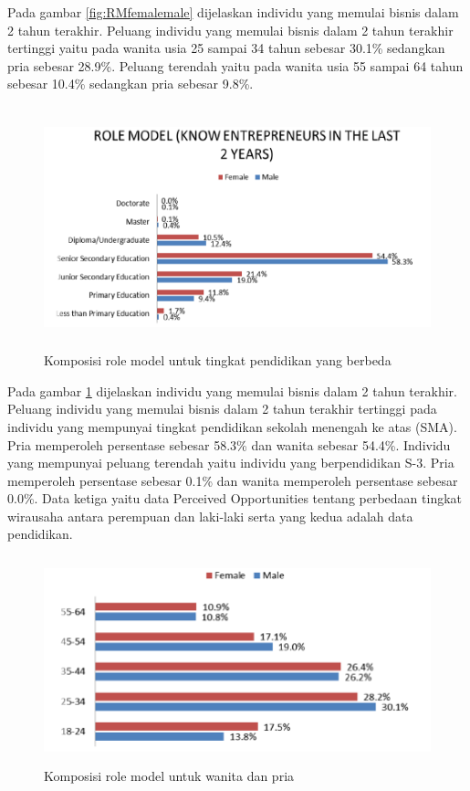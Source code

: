 Pada gambar \ref{fig:RMfemalemale} dijelaskan individu yang memulai bisnis dalam 2 tahun terakhir. Peluang individu yang memulai bisnis dalam 2 tahun terakhir tertinggi yaitu pada wanita usia 25 sampai 34 tahun sebesar 30.1\% sedangkan pria sebesar 28.9\%. Peluang terendah yaitu pada wanita usia 55 sampai 64 tahun sebesar 10.4\% sedangkan pria sebesar 9.8\%.


\begin{figure} [H]
	\centering  
	\includegraphics[width=13cm, height=7cm]{RMpendidikan} 
	\caption[Komposisi role model untuk tingkat pendidikan yang berbeda]{Komposisi role model untuk tingkat pendidikan yang berbeda} 
	\label{fig:RMpendidikan} 
\end{figure}  


Pada gambar \ref{fig:RMpendidikan} dijelaskan individu yang memulai bisnis dalam 2 tahun terakhir. Peluang individu yang memulai bisnis dalam 2 tahun terakhir tertinggi pada individu yang mempunyai tingkat pendidikan sekolah menengah ke atas (SMA). Pria memperoleh persentase sebesar 58.3\% dan wanita sebesar 54.4\%. Individu yang mempunyai peluang terendah yaitu individu yang berpendidikan S-3. Pria memperoleh persentase sebesar 0.1\% dan wanita memperoleh persentase sebesar 0.0\%. Data ketiga yaitu data Perceived Opportunities tentang perbedaan tingkat wirausaha antara perempuan dan laki-laki serta yang kedua adalah data pendidikan.

\begin{figure} [H]
	\centering  
	\includegraphics[width=12cm, height=6cm]{POfemalemale} 
	\caption[Komposisi role model untuk wanita dan pria]{Komposisi role model untuk wanita dan pria} 
	\label{fig:POfemalemale} 
\end{figure} 

